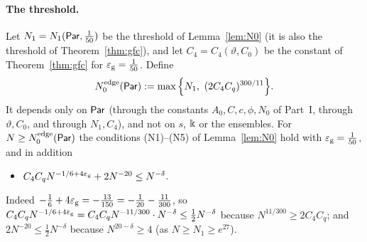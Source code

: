 \paragraph{The threshold.} Let $N_1=N_1(\mathsf{Par},\frac1{50})$ be the threshold of Lemma~\ref{lem:N0} (it is also the threshold of Theorem~\ref{thm:gfc}), and let $C_4=C_4(\vartheta,C_0)$ be the
constant of Theorem~\ref{thm:gfc} for $\varepsilon_{\mathrm g}=\frac1{50}$. Define
\begin{equation}\label{eq:B2N0}
N_0^{\rm edge}(\mathsf{Par}):=\max\Big\{N_1,\ (2C_4C_q)^{300/11}\Big\}.
\end{equation}
It depends only on $\mathsf{Par}$ (through the constants $A_0,C,c,\phi,N_0$ of Part~I, through $\vartheta,C_0$, and through $N_1,C_4$), and not on $s$, $\Bbbk$ or the ensembles.
For $N\ge N_0^{\rm edge}(\mathsf{Par})$ the conditions (N1)--(N5) of Lemma~\ref{lem:N0} hold with $\varepsilon_{\mathrm g}=\frac1{50}$, and in addition
\begin{itemize}
\item[\textup{(N6)}] $C_4C_qN^{-1/6+4\varepsilon_{\mathrm g}}+2N^{-20}\le N^{-\delta}$.
\end{itemize}
Indeed $-\frac16+4\varepsilon_{\mathrm g}=-\frac{13}{150}=-\frac1{20}-\frac{11}{300}$, so $C_4C_qN^{-1/6+4\varepsilon_{\mathrm g}}=C_4C_qN^{-11/300}\cdot N^{-\delta}\le\frac12N^{-\delta}$ because
$N^{11/300}\ge2C_4C_q$; and $2N^{-20}\le\frac12N^{-\delta}$ because $N^{20-\delta}\ge4$ (as $N\ge N_1\ge e^{27}$).

